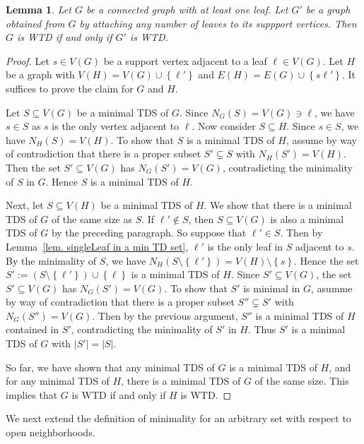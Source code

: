 \documentclass[12pt, reqno]{amsart}
\theoremstyle{definition}
\theoremstyle{plain}
\newtheorem{lemma}[theorem]{Lemma}
\theoremstyle{definition}
\newcommand\set[1]{\left\lbrace #1 \right\rbrace}
\begin{document}
\begin{lemma}
\label{lem. LeafAdding}
Let $G$ be a connected graph with at least one leaf.
Let $G'$ be a graph obtained from $G$ by attaching any number of leaves to its suppport vertices.
Then $G$ is WTD if and only if $G'$ is WTD.
\end{lemma}

\begin{proof}
Let $s \in V(G)$ be a support vertex adjacent to a leaf $\ell \in V(G)$.
Let $H$ be a graph with $V(H) = V(G) \cup \set{\ell'}$ and $E(H) = E(G) \cup \set{s\ell'}$.
It suffices to prove the claim for $G$ and $H$.

Let $S \subseteq V(G)$ be a minimal TDS of $G$.
Since $N_G(S) = V(G) \ni \ell$, we have $s \in S$ as $s$ is the only vertex adjacent to $\ell$.
Now consider $S\subseteq H$.
Since $s \in S$, we have $N_H(S) = V(H)$.
To show that $S$ is a minimal TDS of $H$, assume by way of contradiction that there is a proper subset $S' \subsetneq S$ with $N_H(S') = V(H)$.
Then the set $S' \subseteq V(G)$ has $N_G(S') = V(G)$, contradicting the minimality of $S$ in $G$.
Hence $S$ is a minimal TDS of $H$.

Next, let $S \subseteq V(H)$ be a minimal TDS of $H$.
We show that there is a minimal TDS of $G$ of the same size as $S$.
If $\ell' \not\in S$, then $S \subseteq V(G)$ is also a minimal TDS of $G$ by the preceding paragraph.
So suppose that $\ell' \in S$.
Then by Lemma~\ref{lem. singleLeaf in a min TD set}, $\ell'$ is the only leaf in $S$ adjacent to $s$.
By the minimality of $S$, we have $N_H(S\setminus \set{\ell'}) = V(H)\setminus \set{s}$.
Hence the set $S' := (S \setminus \set{\ell'}) \cup \set{\ell}$ is a minimal TDS of $H$.
Since $S' \subseteq V(G)$, the set $S' \subseteq V(G)$ has $N_G(S') = V(G)$.
To show that $S'$ is minimal in $G$, asumme by way of contradiction that there is a proper subset $S'' \subsetneq S'$ with $N_G(S'') = V(G)$.
Then by the previous argument, $S''$ is a minimal TDS of $H$ contained in $S'$, contradicting the minimality of $S'$ in $H$.
Thus $S'$ is a minimal TDS of $G$ with $|S'| = |S|$.

So far, we have shown that any minimal TDS of $G$ is a minimal TDS of $H$, and for any minimal TDS of $H$, there is a minimal TDS of $G$ of the same size.
This implies that $G$ is WTD if and only if $H$ is WTD.
\end{proof}

We next extend the definition of minimality for an arbitrary set with respect to open neighborhoods.
\end{document}
